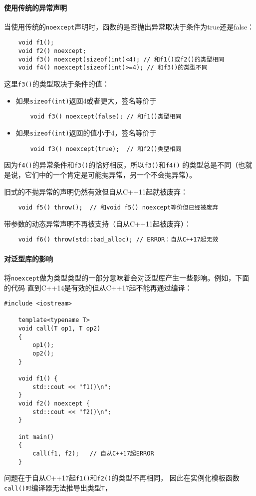 \paragraph{使用传统的异常声明}
当使用传统的\texttt{noexcept}声明时，函数的是否抛出异常取决于条件为true还是false：
\begin{lstlisting}
    void f1();
    void f2() noexcept;
    void f3() noexcept(sizeof(int)<4); // 和f1()或f2()的类型相同
    void f4() noexcept(sizeof(int)>=4); // 和f3()的类型不同
\end{lstlisting}
这里\texttt{f3()}的类型取决于条件的值：
\begin{itemize}[leftmargin=*]
    \item 如果\texttt{sizeof(int)}返回4或者更大，签名等价于
    \begin{lstlisting}
    void f3() noexcept(false); // 和f1()类型相同
    \end{lstlisting}
    \item 如果\texttt{sizeof(int)}返回的值小于4，签名等价于
    \begin{lstlisting}
    void f3() noexcept(true);  // 和f2()类型相同
    \end{lstlisting}
\end{itemize}
因为\texttt{f4()}的异常条件和\texttt{f3()}的恰好相反，所以\texttt{f3()}和\texttt{f4()}
的类型总是不同（也就是说，它们中的一个肯定是可能抛异常，另一个不会抛异常）。

旧式的不抛异常的声明仍然有效但自从C++11起就被废弃：
\begin{lstlisting}
    void f5() throw();  // 和void f5() noexcept等价但已经被废弃
\end{lstlisting}
带参数的动态异常声明不再被支持（自从C++11起被废弃）：
\begin{lstlisting}
    void f6() throw(std::bad_alloc); // ERROR：自从C++17起无效
\end{lstlisting}

\paragraph{对泛型库的影响}
将\texttt{noexcept}做为类型类型的一部分意味着会对泛型库产生一些影响。例如，下面的代码
直到C++14是有效的但从C++17起不能再通过编译：
\begin{lstlisting}[frame=single, title=lang/noexceptcalls.cpp]
    #include <iostream>

    template<typename T>
    void call(T op1, T op2)
    {
        op1();
        op2();
    }

    void f1() {
        std::cout << "f1()\n";
    }
    void f2() noexcept {
        std::cout << "f2()\n";
    }

    int main()
    {
        call(f1, f2);   // 自从C++17起ERROR
    }
\end{lstlisting}
问题在于自从C++17起\texttt{f1()}和\texttt{f2()}的类型不再相同，
因此在实例化模板函数\texttt{call()时}编译器无法推导出类型\texttt{T}，

